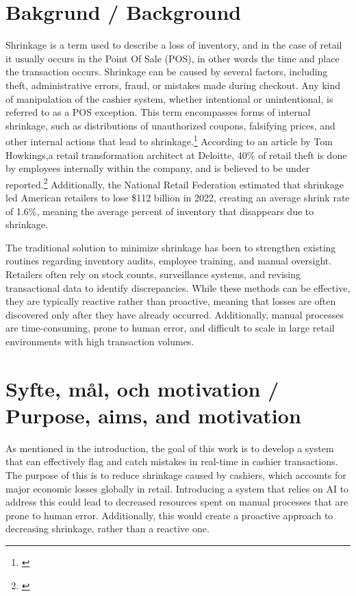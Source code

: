 \documentclass[a4paper,12pt]{article}
\begin{document}
\section{Bakgrund / Background}
\label{sec:bakgrund}
Shrinkage is a term used to describe a loss of inventory, and in the case of retail it usually occurs in the Point Of Sale (POS), in other words the time and place the transaction occurs. Shrinkage can be caused by several factors, including theft, administrative errors, fraud, or mistakes made during checkout. Any kind of manipulation of the cashier system, whether intentional or unintentional, is referred to as a POS exception. This term encompasses forms of internal shrinkage, such as distributions of unauthorized coupons, falsifying prices, and other internal actions that lead to shrinkage.\footnote{\cite{netsuite-shrink}} According to an article by Tom Howkings,a retail transformation architect at Deloitte, 40\% of retail theft is done by employees internally within the company, and is believed to be under reported.\footnote{\cite{deloitte-shrink}} Additionally, the National Retail Federation estimated that shrinkage led American retailers to lose \$112 billion in 2022, creating an average shrink rate of 1.6\%, meaning the average percent of inventory that disappears due to shrinkage.

The traditional solution to minimize shrinkage has been to strengthen existing routines regarding inventory audits, employee training, and manual oversight. Retailers often rely on stock counts, surveillance systems, and revising transactional data to identify discrepancies. While these methods can be effective, they are typically reactive rather than proactive, meaning that losses are often discovered only after they have already occurred. Additionally, manual processes are time-consuming, prone to human error, and difficult to scale in large retail environments with high transaction volumes.

\section{Syfte, mål, och motivation / Purpose, aims, and motivation}\label{sec:syfte}
As mentioned in the introduction, the goal of this work is to develop a system that can effectively flag and catch mistakes in real-time in cashier transactions. The purpose of this is to reduce shrinkage caused by cashiers, which accounts for major economic losses globally in retail. Introducing a system that relies on AI to address this could lead to decreased resources spent on manual processes that are prone to human error. Additionally, this would create a proactive approach to decreasing shrinkage, rather than a reactive one.
\end{document}
